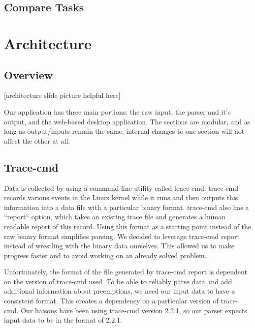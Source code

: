 \documentclass{hmcclinic}
\begin{document}
  \subsection{Compare Tasks}

\section{Architecture} %

  \subsection{Overview}

  [architecture slide picture helpful here]

  Our application has three main portions: the raw input, the parser and it's
  output, and the web-based desktop application. The sections are modular, and
  as long as output/inputs remain the same, internal changes to one section will
  not affect the other at all.

  \subsection{Trace-cmd}

  Data is collected by using a command-line utility called trace-cmd.
  trace-cmd records various events in the Linux kernel while it runs and then
  outputs this information into a data file with a particular binary format.
  trace-cmd also has a ``report`` option, which takes an existing trace file and
  generates a human readable report of this record. Using this format as a
  starting point instead of the raw binary format simplifies parsing.  We
  decided to leverage trace-cmd report instead of wrestling with the binary data
  ourselves. This allowed us to make progress faster and to avoid working on an
  already solved problem.

   Unfortunately, the format of the file generated by trace-cmd report is
   dependent on the version of trace-cmd used. To be able to reliably parse data
   and add additional information about preemptions, we need our input data to
   have a consistent format. This creates a dependency on a particular version
   of trace-cmd. Our liaisons have been using trace-cmd version 2.2.1, so our
   parser expects input data to be in the format of 2.2.1.
\end{document}
